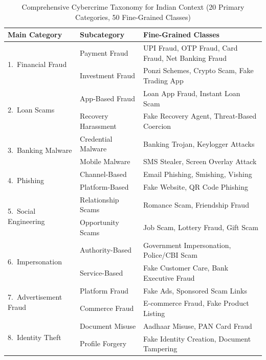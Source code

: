 \begin{table}[t]
\caption{Comprehensive Cybercrime Taxonomy for Indian Context (20 Primary Categories, 50 Fine-Grained Classes)}
\centering
\small
\setlength{\tabcolsep}{4pt}
\renewcommand{\arraystretch}{1.05}
\begin{tabular}{|l|l|p{7.5cm}|}
\hline
\textbf{Main Category} & \textbf{Subcategory} & \textbf{Fine-Grained Classes} \\
\hline

\multirow{2}{*}{1.\ Financial Fraud}
  & Payment Fraud       & UPI Fraud, OTP Fraud, Card Fraud, Net Banking Fraud \\
  & Investment Fraud    & Ponzi Schemes, Crypto Scam, Fake Trading App \\
\hline

\multirow{2}{*}{2.\ Loan Scams}
  & App-Based Fraud     & Loan App Fraud, Instant Loan Scam \\
  & Recovery Harassment & Fake Recovery Agent, Threat-Based Coercion \\
\hline

\multirow{2}{*}{3.\ Banking Malware}
  & Credential Malware  & Banking Trojan, Keylogger Attacks \\
  & Mobile Malware      & SMS Stealer, Screen Overlay Attack \\
\hline

\multirow{2}{*}{4.\ Phishing}
  & Channel-Based       & Email Phishing, Smishing, Vishing \\
  & Platform-Based      & Fake Website, QR Code Phishing \\
\hline

\multirow{2}{*}{5.\ Social Engineering}
  & Relationship Scams  & Romance Scam, Friendship Fraud \\
  & Opportunity Scams   & Job Scam, Lottery Fraud, Gift Scam \\
\hline

\multirow{2}{*}{6.\ Impersonation}
  & Authority-Based     & Government Impersonation, Police/CBI Scam \\
  & Service-Based       & Fake Customer Care, Bank Executive Fraud \\
\hline

\multirow{2}{*}{7.\ Advertisement Fraud}
  & Platform Fraud      & Fake Ads, Sponsored Scam Links \\
  & Commerce Fraud      & E-commerce Fraud, Fake Product Listing \\
\hline

\multirow{2}{*}{8.\ Identity Theft}
  & Document Misuse     & Aadhaar Misuse, PAN Card Fraud \\
  & Profile Forgery     & Fake Identity Creation, Document Tampering \\
\hline


\end{tabular}
\end{table}
